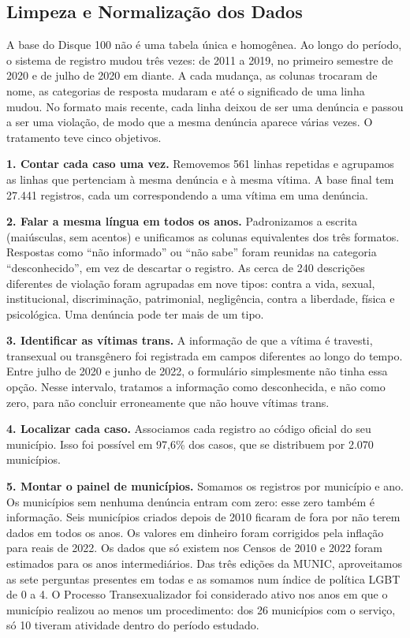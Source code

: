 \documentclass[12pt]{article}
\begin{document}
\subsection{Limpeza e Normalização dos Dados}

A base do Disque 100 não é uma tabela única e homogênea. Ao longo do período, o sistema de registro mudou três vezes: de 2011 a 2019, no primeiro semestre de 2020 e de julho de 2020 em diante. A cada mudança, as colunas trocaram de nome, as categorias de resposta mudaram e até o significado de uma linha mudou. No formato mais recente, cada linha deixou de ser uma denúncia e passou a ser uma violação, de modo que a mesma denúncia aparece várias vezes. O tratamento teve cinco objetivos.

\textbf{1. Contar cada caso uma vez.} Removemos 561 linhas repetidas e agrupamos as linhas que pertenciam à mesma denúncia e à mesma vítima. A base final tem 27.441 registros, cada um correspondendo a uma vítima em uma denúncia.

\textbf{2. Falar a mesma língua em todos os anos.} Padronizamos a escrita (maiúsculas, sem acentos) e unificamos as colunas equivalentes dos três formatos. Respostas como ``não informado'' ou ``não sabe'' foram reunidas na categoria ``desconhecido'', em vez de descartar o registro. As cerca de 240 descrições diferentes de violação foram agrupadas em nove tipos: contra a vida, sexual, institucional, discriminação, patrimonial, negligência, contra a liberdade, física e psicológica. Uma denúncia pode ter mais de um tipo.

\textbf{3. Identificar as vítimas trans.} A informação de que a vítima é travesti, transexual ou transgênero foi registrada em campos diferentes ao longo do tempo. Entre julho de 2020 e junho de 2022, o formulário simplesmente não tinha essa opção. Nesse intervalo, tratamos a informação como desconhecida, e não como zero, para não concluir erroneamente que não houve vítimas trans.

\textbf{4. Localizar cada caso.} Associamos cada registro ao código oficial do seu município. Isso foi possível em 97,6\% dos casos, que se distribuem por 2.070 municípios.

\textbf{5. Montar o painel de municípios.} Somamos os registros por município e ano. Os municípios sem nenhuma denúncia entram com zero: esse zero também é informação. Seis municípios criados depois de 2010 ficaram de fora por não terem dados em todos os anos. Os valores em dinheiro foram corrigidos pela inflação para reais de 2022. Os dados que só existem nos Censos de 2010 e 2022 foram estimados para os anos intermediários. Das três edições da MUNIC, aproveitamos as sete perguntas presentes em todas e as somamos num índice de política LGBT de 0 a 4. O Processo Transexualizador foi considerado ativo nos anos em que o município realizou ao menos um procedimento: dos 26 municípios com o serviço, só 10 tiveram atividade dentro do período estudado.
\end{document}
